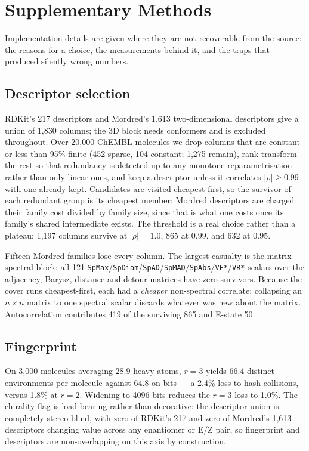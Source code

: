 \section{Supplementary Methods}

Implementation details are given where they are not recoverable from the source: the reasons for
a choice, the measurements behind it, and the traps that produced silently wrong numbers.

\subsection{Descriptor selection}

RDKit's 217 descriptors and Mordred's 1{,}613 two-dimensional descriptors give a union of
1{,}830 columns; the 3D block needs conformers and is excluded throughout. Over 20{,}000 ChEMBL
molecules we drop columns that are constant or less than 95\% finite (452 sparse, 104 constant;
1{,}275 remain), rank-transform the rest so that redundancy is detected up to any monotone
reparametrisation rather than only linear ones, and keep a descriptor unless it correlates
$|\rho| \geq 0.99$ with one already kept. Candidates are visited cheapest-first, so the survivor
of each redundant group is its cheapest member; Mordred descriptors are charged their family
cost divided by family size, since that is what one costs once its family's shared intermediate
exists. The threshold is a real choice rather than a plateau: 1{,}197 columns survive at
$|\rho| = 1.0$, 865 at $0.99$, and 632 at $0.95$.

Fifteen Mordred families lose every column. The largest casualty is the matrix-spectral block:
all 121 \texttt{SpMax}/\texttt{SpDiam}/\texttt{SpAD}/\texttt{SpMAD}/\texttt{SpAbs}/\texttt{VE*}/\texttt{VR*}
scalars over the adjacency, Barysz, distance and detour matrices have zero survivors. Because
the cover runs cheapest-first, each had a \emph{cheaper} non-spectral correlate; collapsing an
$n \times n$ matrix to one spectral scalar discards whatever was new about the matrix.
Autocorrelation contributes 419 of the surviving 865 and E-state 50.

\subsection{Fingerprint}

On 3{,}000 molecules averaging 28.9 heavy atoms, $r = 3$ yields 66.4 distinct environments per
molecule against 64.8 on-bits --- a 2.4\% loss to hash collisions, versus 1.8\% at $r = 2$.
Widening to 4096 bits reduces the $r = 3$ loss to 1.0\%. The chirality flag is load-bearing
rather than decorative: the descriptor union is completely stereo-blind, with zero of RDKit's
217 and zero of Mordred's 1{,}613 descriptors changing value across any enantiomer or E/Z pair,
so fingerprint and descriptors are non-overlapping on this axis by construction.

